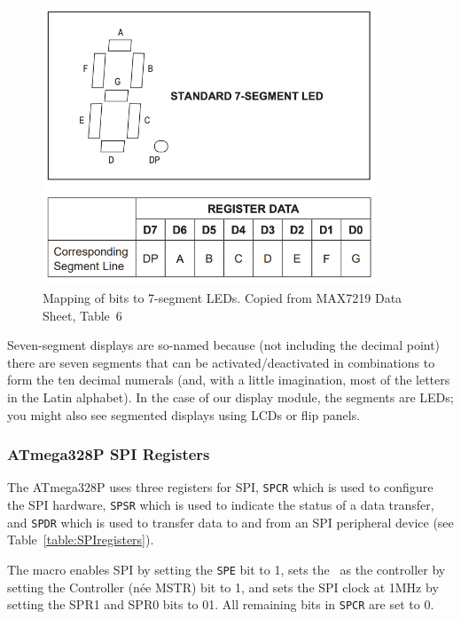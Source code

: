 \begin{figure}
    \centering
    \includegraphics[width=10cm]{SevenSegment}
    \caption{Mapping of bits to 7-segment LEDs. \tiny Copied from MAX7219 Data Sheet, Table~6 \label{fig:SevenSegment}}
\end{figure}

Seven-segment displays are so-named because (not including the decimal point)
there are seven segments that can be activated/deactivated in combinations to
form the ten decimal numerals (and, with a little imagination, most of the
letters in the Latin alphabet). In the case of our display module, the segments
are LEDs; you might also see segmented displays using LCDs or flip panels.

\subsubsection{ATmega328P SPI Registers}

The ATmega328P uses three registers for SPI, \texttt{SPCR} which is used to
configure the SPI hardware, \texttt{SPSR} which is used to indicate the status
of a data transfer, and \texttt{SPDR} which is used to transfer data to and from
an SPI peripheral device (see Table~\ref{table:SPIregisters}).

The  macro enables SPI by setting the \texttt{SPE} bit
to 1, sets the \nano\ as the controller by setting the Controller (née MSTR) bit
to 1, and sets the SPI clock at 1MHz by setting the SPR1 and SPR0 bits to 01.
All remaining bits in \texttt{SPCR} are set to 0.

